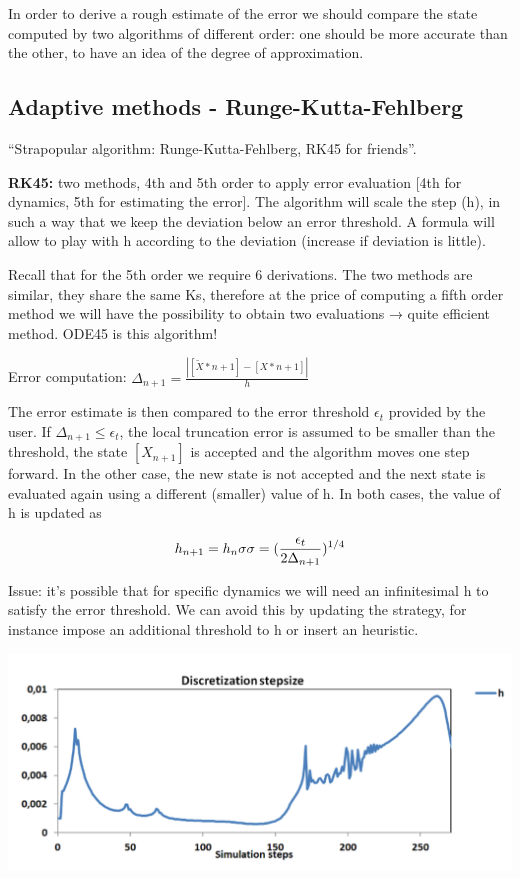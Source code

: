 In order to derive a rough estimate of the error we should compare the
state computed by two algorithms of different order: one should be more
accurate than the other, to have an idea of the degree of approximation.

\hypertarget{adaptive-methods---runge-kutta-fehlberg}{%
\subsection{Adaptive methods -
Runge-Kutta-Fehlberg}\label{adaptive-methods---runge-kutta-fehlberg}}

``Strapopular algorithm: Runge-Kutta-Fehlberg, RK45 for friends''.

\textbf{RK45:} two methods, 4th and 5th order to apply error evaluation
{[}4th for dynamics, 5th for estimating the error{]}. The algorithm will
scale the step (h), in such a way that we keep the deviation below an
error threshold. A formula will allow to play with h according to the
deviation (increase if deviation is little).

Recall that for the 5th order we require 6 derivations. The two methods
are similar, they share the same Ks, therefore at the price of computing
a fifth order method we will have the possibility to obtain two
evaluations → quite efficient method. ODE45 is this algorithm!

Error computation:
$\Delta_{n+1}=\frac{|[\tilde{X}*{n+1}]-[X*{n+1}]|}{h}$

The error estimate is then compared to the error threshold $\epsilon_t$
provided by the user. If $\Delta_{n+1} \leq \epsilon_t$, the local truncation error is
assumed to be smaller than the threshold, the state $[X_{n+1}]$ is
accepted and the algorithm moves one step forward. In the other case,
the new state is not accepted and the next state is evaluated again
using a different (smaller) value of h. In both cases, the value of h is
updated as

$$
h_{n+1}=h_n\sigma \\ \sigma =(\frac{\epsilon_t}{2\Delta_{n+1}})^{1/4}
$$

Issue: it's possible that for specific dynamics we will need an
infinitesimal h to satisfy the error threshold. We can avoid this by
updating the strategy, for instance impose an additional threshold to h
or insert an heuristic.

\includegraphics{05_images/discretization.png}

